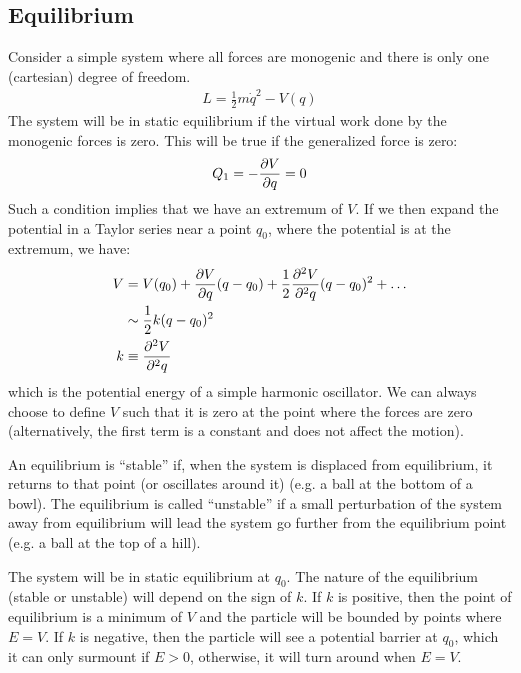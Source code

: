 \subsection{Equilibrium}
Consider a simple system where all forces are monogenic and there is only one (cartesian) degree of freedom.
\begin{align}
L=\frac{1}{2}m\dot q^2-V(q)
\end{align}
The system will be in static equilibrium if the virtual work done by the monogenic forces is zero. This will be true if the generalized force is zero:
\begin{align}
Q_1=-\frac{\partial V}{\partial q}=0 
\end{align}
Such a condition implies that we have an extremum of $V$. If we then expand the potential in a Taylor series near a point $q_0$, where the potential is at the extremum, we have:
 \begin{align}
 V &= V(q_0)+\frac{\partial V}{\partial q}(q-q_0)+\frac{1}{2}\frac{\partial ^2V}{\partial ^2q}(q-q_0)^2+\dots\nonumber\\
 &\sim \frac{1}{2}k(q-q_0)^2\nonumber\\
 k&\equiv \frac{\partial ^2V}{\partial ^2q}
 \end{align}
which is the potential energy of a simple harmonic oscillator. We can always choose to define $V$ such that it is zero at the point where the forces are zero (alternatively, the first term is a constant and does not affect the motion).

An equilibrium is ``stable'' if, when the system is displaced from equilibrium, it returns to that point (or oscillates around it) (e.g. a ball at the bottom of a bowl). The equilibrium is called ``unstable'' if a small perturbation of the system away from equilibrium will lead the system go further from the equilibrium point (e.g. a ball at the top of a hill).

The system will be in static equilibrium at $q_0$. The nature of the equilibrium (stable or unstable) will depend on the sign of $k$. If $k$ is positive, then the point of  equilibrium is a minimum of $V$ and the particle will be bounded by points where $E=V$. If $k$ is negative, then the particle will see a potential barrier at $q_0$, which it can only surmount if $E>0$, otherwise, it will turn around when $E=V$.

